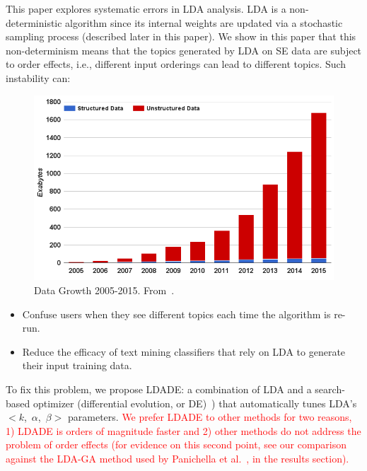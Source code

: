 \documentclass[twocolumn,5p,sort&compress]{elsarticle}
\newcommand{\bi}{\begin{itemize}}
\newcommand{\ei}{\end{itemize}}
\theoremstyle{break}
\begin{document}
This paper explores systematic errors in LDA analysis.
LDA is a non-deterministic algorithm since its internal weights are updated via a stochastic sampling process (described
later in this paper).
We show in this paper that this non-determinism means that the  topics generated by LDA on
SE data are subject to order effects, i.e., different input orderings
can lead to different topics.
Such instability can:
\begin{figure}[!b]
  \captionsetup{justification=centering}
  \includegraphics[width=\linewidth]{./fig/data.png}
  \caption{Data Growth 2005-2015. From~\cite{nadkarni2014structured}.}
  \label{fig: data}
\end{figure}

\bi
\item
  Confuse users when they see different topics each time
the algorithm is re-run.
\item
  Reduce the efficacy of text mining classifiers that rely on LDA to
  generate their input training data.
\ei
To fix this problem,
we propose LDADE: a  combination of LDA and a search-based optimizer (differential evolution, or DE)~\cite{storn1997differential})
that automatically tunes LDA's \mbox{$<k$, $\alpha$, $\beta>$} parameters. \textcolor{red}{We prefer LDADE to other methods for two reasons, 1) LDADE is orders of magnitude faster and 2) other methods do not address the problem of order effects (for evidence on this second point,
see our  comparison against the LDA-GA method used by Panichella et al.~\cite{panichella2013effectively}, in the results section).
}
\end{document}

